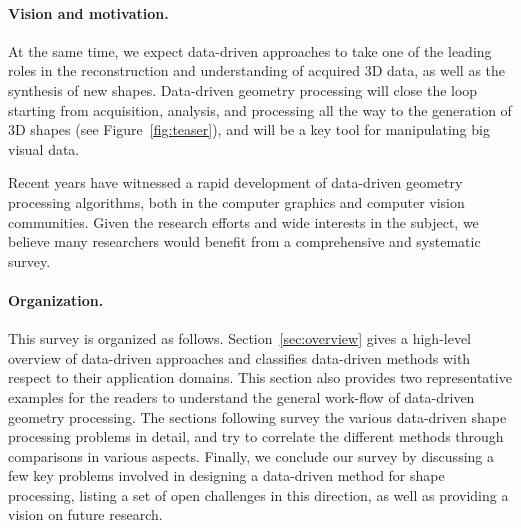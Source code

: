 \paragraph*{Vision and motivation.}
%
At the same time, we expect data-driven approaches to take one of the leading roles in the reconstruction and understanding of acquired 3D data, as well as the synthesis of new shapes.
Data-driven geometry processing will close the loop starting from acquisition, analysis, and processing all the way to the generation of 3D shapes (see Figure~\ref{fig:teaser}), and will be a key tool for manipulating big visual data.

Recent years have witnessed a rapid development of data-driven geometry processing algorithms, both in the computer graphics and computer vision communities. Given the research efforts and wide interests in the subject, we believe many researchers would benefit from a comprehensive and systematic survey. 

\paragraph*{Organization.}
This survey is organized as follows. Section~\ref{sec:overview} gives a high-level overview of data-driven approaches and classifies data-driven methods with respect to their application domains. This section also provides two representative examples for the readers to understand the general work-flow of data-driven geometry processing. The sections following survey the various data-driven shape processing problems in detail, and try to correlate the different methods through comparisons in various aspects. Finally, we conclude our survey by discussing a few key problems involved in designing a data-driven
method for shape processing, listing a set of open challenges in this direction, as well as providing a vision on future research.

